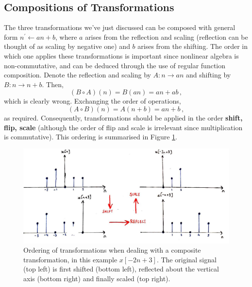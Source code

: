 \subsection{Compositions of Transformations}
%
The three transformations we've just discussed can be composed with general form
$n^\prime \leftarrow an + b$, where $a$ arises from the reflection and scaling (reflection
can be thought of as scaling by negative one) and $b$ arises from the shifting.
The order in which one applies these transformations is important since nonlinear algebra
is non-commutative, and can be deduced through the use of regular function composition.
Denote the reflection and scaling by $A: n\rightarrow an$ and shifting by
$B: n\rightarrow n+b$. Then,
%
\begin{displaymath}
  (B\circ A)(n) = B(an) = an + ab \,,
\end{displaymath}
%
which is clearly wrong. Exchanging the order of operations,
%
\begin{displaymath}
  (A\circ B)(n) = A(n + b) = an + b \,,
\end{displaymath}
%
as required. Consequently, transformations should be applied in the order
\textbf{shift, flip, scale} (although the order of flip and scale is irrelevant
since multiplication is commutative). This ordering is summarised in Figure
\ref{fig::lecture_1_transformation_order}.
%
\begin{figure}[!htb]
  \includegraphics[width=\textwidth]{images/lecture_1_transformation_order.JPG}
  \caption{
    Ordering of transformations when dealing with a composite transformation, in
    this example $x[-2n+3]$.
    The original signal (top left) is first shifted (bottom left), reflected
    about the vertical axis (bottom right) and finally scaled (top right).
  }
  \label{fig::lecture_1_transformation_order}
\end{figure}


